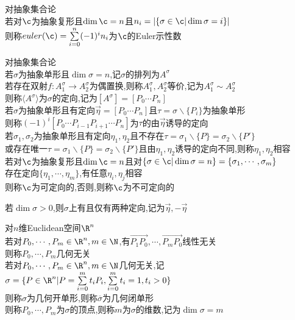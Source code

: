 \begin{dingyi}
对抽象集合论\\
若对$\c$为抽象复形且$\dim\c=n$且$n_i=|\{\sigma\in\c|\dim\sigma=i\}|$\\
则称$euler(\c)=\sum\limits_{i=0}^{n}(-1)^{i}n_{i}$为$\c$的Euler示性数
\end{dingyi}

\begin{dingyi}
对抽象集合论\\
若$\sigma$为抽象单形且$\dim\sigma=n$,记$\sigma$的排列为$A^{\sigma}$\\
若存在双射$f:A^{\sigma}_{1}\to A^{\sigma}_{2}$为偶置换,则称$A^{\sigma}_{1},A^{\sigma}_{2}$等价,记为$A^{\sigma}_{1}\sim A^{\sigma}_{2}$\\
则称$\langle A^{\sigma}\rangle$为$\sigma$的定向,记为$[A^{\sigma}]=[P_0\cdots P_n]$\\
若$\sigma$为抽象单形且有定向$\vec{\eta}=[P_0\cdots P_n]$且$\tau=\sigma\backslash\{P_i\}$为抽象单形\\
则称$(-1)^{i}[P_0\cdots P_{i-1}P_{i+1}\cdots P_n]$为$\tau$的由$\vec{\eta}$诱导的定向\\
若$\sigma_1,\sigma_2$为抽象单形且有定向$\eta_1,\eta_2$且不存在$\tau=\sigma_1\backslash\{P\}=\sigma_2\backslash\{P'\}$\\
或存在唯一$\tau=\sigma_1\backslash\{P\}=\sigma_2\backslash\{P'\}$且由$\eta_1,\eta_2$诱导的定向不同,则称$\eta_1,\eta_2$相容\\
若对$\c$为抽象复形且$\dim\c=n$且对$\{\sigma\in\c|\dim\sigma=n\}=\{\sigma_1,\cdots,\sigma_m\}$\\
存在定向$\{\eta_1,\cdots,\eta_m\}$,有任意$\eta_i,\eta_j$相容\\
则称$\c$为可定向的,否则,则称$\c$为不可定向的
\end{dingyi}

\begin{zhu}
若$\dim\sigma>0$,则$\sigma$上有且仅有两种定向,记为$\vec{\eta},-\vec{\eta}$
\end{zhu}

\begin{dingyi}
对$n$维Euclidean空间$\R^n$\\
若对$P_0,\cdots,P_m\in\R^n,m\in\N$,有$\overrightarrow{P_1P_0},\cdots,\overrightarrow{P_mP_0}$线性无关\\
则称$P_0,\cdots,P_m$几何无关\\
若对$P_0,\cdots,P_m\in\R^n,m\in\N$几何无关,记$\sigma=\{P\in\R^n|P=\sum\limits_{i=0}^{m}t_iP_i,\sum\limits_{i=0}^{m}t_i=1,t_i>0\}$\\
则称$\sigma$为几何开单形,则称$\overline{\sigma}$为几何闭单形\\
则称$P_0,\cdots,P_m$为$\sigma$的顶点,则称$m$为$\sigma$的维数,记为$\dim \sigma=m$
\end{dingyi}


